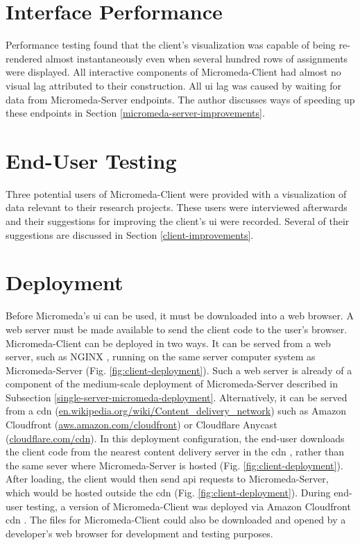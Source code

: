 \section{Interface Performance}

Performance testing found that the client's visualization was capable of being re-rendered almost instantaneously even when several hundred rows of assignments were displayed. All interactive components of Micromeda-Client had almost no visual lag attributed to their construction. All \gls{ui} lag was caused by waiting for data from Micromeda-Server endpoints. The author discusses ways of speeding up these endpoints in Section \ref{micromeda-server-improvements}.

\section{End-User Testing}

Three potential users of Micromeda-Client were provided with a visualization of data relevant to their research projects. These users were interviewed afterwards and their suggestions for improving the client's \gls{ui} were recorded. Several of their suggestions are discussed in Section \ref{client-improvements}. 

\section{Deployment}

Before Micromeda's \gls{ui} can be used, it must be downloaded into a web browser. A web server must be made available to send the client code to the user's browser. Micromeda-Client can be deployed in two ways. It can be served from a web server, such as NGINX \cite{reese2008nginx}, running on the same server computer system as Micromeda-Server (Fig. \ref{fig:client-deployment}). Such a web server is already of a component of the medium-scale deployment of Micromeda-Server described in Subsection \ref{single-server-micromeda-deployment}. Alternatively, it can be served from a \gls{cdn} \cite{farber2003internet} (\href{en.wikipedia.org/wiki/Content\_delivery\_network}{en.wikipedia.org/wiki/Content\_delivery\_network}) such as Amazon Cloudfront \cite{varia2014overview} (\href{aws.amazon.com/cloudfront}{aws.amazon.com/cloudfront}) or Cloudflare Anycast \cite{calder2015analyzing} (\href{cloudflare.com/cdn}{cloudflare.com/cdn}). In this deployment configuration, the end-user downloads the client code from the nearest content delivery server in the \gls{cdn} , rather than the same sever where Micromeda-Server is hosted (Fig. \ref{fig:client-deployment}). After loading, the client would then send \gls{api} requests to Micromeda-Server, which would be hosted outside the \gls{cdn}  (Fig. \ref{fig:client-deployment}). During end-user testing, a version of Micromeda-Client was deployed via Amazon Cloudfront \gls{cdn} . The files for Micromeda-Client could also be downloaded and opened by a developer's web browser for development and testing purposes.

